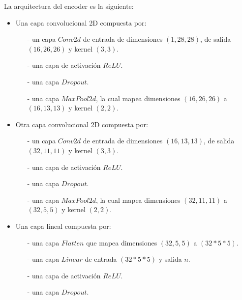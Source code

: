 \documentclass[aps,prl,reprint,groupedaddress]{revtex4-2}
\begin{document}
La arquitectura del encoder es la siguiente:
\begin{itemize}
  \item Una capa convolucional 2D compuesta por:
  \begin{itemize}
    \item [-] un capa $Conv2d$ de entrada de dimensiones $(1, 28, 28)$, de 
    salida $(16, 26, 26)$ y kernel $(3,3)$.
    \item [-] una capa de activación $ReLU$.
    \item [-] una capa $Dropout$.
    \item [-] una capa $MaxPool2d$, la cual mapea dimensiones $(16, 26, 26)$ a
    $(16, 13, 13)$ y kernel $(2,2)$.
  \end{itemize}
  \item Otra capa convolucional 2D compuesta por:
  \begin{itemize}
    \item [-] un capa $Conv2d$ de entrada de dimensiones $(16, 13, 13)$, de 
    salida $(32, 11, 11)$ y kernel $(3,3)$.
    \item [-] una capa de activación $ReLU$.
    \item [-] una capa $Dropout$.
    \item [-] una capa $MaxPool2d$, la cual mapea dimensiones $(32, 11, 11)$ a
    $(32, 5, 5)$ y kernel $(2,2)$.
  \end{itemize}
  \item Una capa lineal compuesta por:
  \begin{itemize}
    \item [-] una capa $Flatten$ que mapea dimensiones $(32, 5, 5)$ a $(32*5*5)$.
    \item [-] una capa $Linear$ de entrada $(32*5*5)$ y salida $n$.
    \item [-] una capa de activación $ReLU$.
    \item [-] una capa $Dropout$.
  \end{itemize}
\end{itemize}
\end{document}
